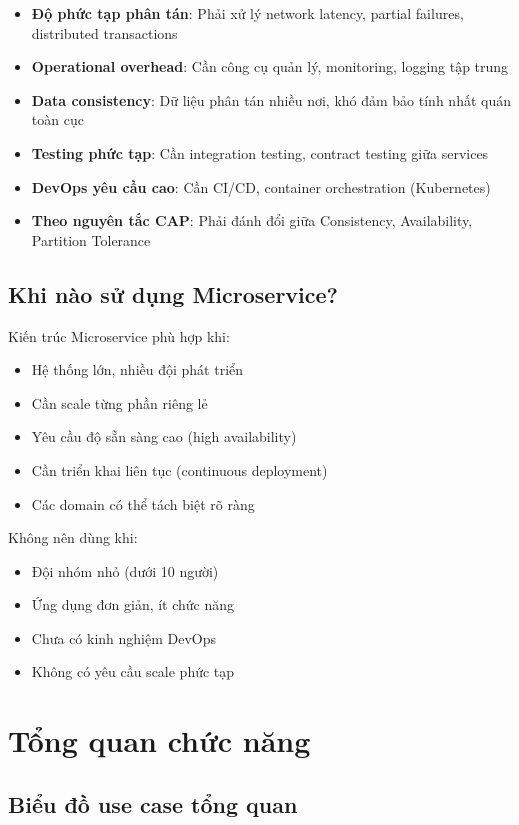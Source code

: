 \documentclass[12pt]{extreport}
\begin{document}
\begin{itemize}
    \item \textbf{Độ phức tạp phân tán}: Phải xử lý network latency, partial failures, distributed transactions
    \item \textbf{Operational overhead}: Cần công cụ quản lý, monitoring, logging tập trung
    \item \textbf{Data consistency}: Dữ liệu phân tán nhiều nơi, khó đảm bảo tính nhất quán toàn cục
    \item \textbf{Testing phức tạp}: Cần integration testing, contract testing giữa services
    \item \textbf{DevOps yêu cầu cao}: Cần CI/CD, container orchestration (Kubernetes)
    \item \textbf{Theo nguyên tắc CAP}: Phải đánh đổi giữa Consistency, Availability, Partition Tolerance
\end{itemize}

\subsection{Khi nào sử dụng Microservice?}

Kiến trúc Microservice phù hợp khi:
\begin{itemize}
    \item Hệ thống lớn, nhiều đội phát triển
    \item Cần scale từng phần riêng lẻ
    \item Yêu cầu độ sẵn sàng cao (high availability)
    \item Cần triển khai liên tục (continuous deployment)
    \item Các domain có thể tách biệt rõ ràng
\end{itemize}

Không nên dùng khi:
\begin{itemize}
    \item Đội nhóm nhỏ (dưới 10 người)
    \item Ứng dụng đơn giản, ít chức năng
    \item Chưa có kinh nghiệm DevOps
    \item Không có yêu cầu scale phức tạp
\end{itemize}

\section{Tổng quan chức năng}

\subsection{Biểu đồ use case tổng quan}
\end{document}
